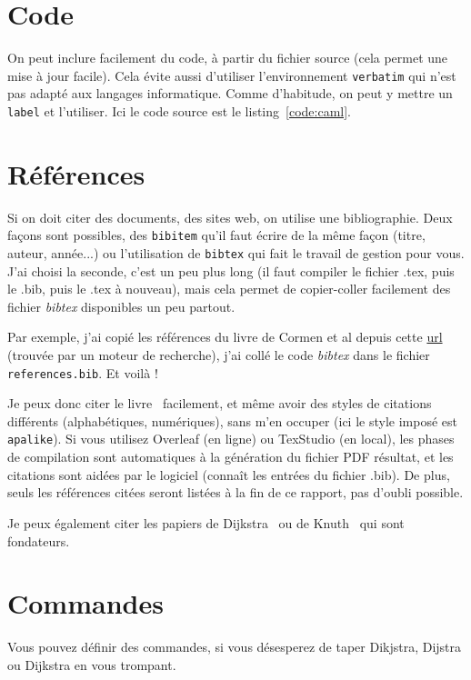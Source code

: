 \documentclass{rapportAlgoM1}
\begin{document}
\section{Code}
On peut inclure facilement du code, à partir du fichier source (cela permet une mise à jour facile). Cela évite aussi d'utiliser l'environnement \verb+verbatim+ qui n'est pas adapté aux langages informatique. Comme d'habitude, on peut y mettre un \verb+label+ et l'utiliser. Ici le code source est le listing~\ref{code:caml}.



\section{Références}
Si on doit citer des documents, des sites web, on utilise une bibliographie. Deux façons sont possibles, des \verb+bibitem+ qu'il faut écrire de la même façon (titre, auteur, année...) ou l'utilisation de \verb+bibtex+ qui fait le travail de gestion pour vous. J'ai choisi la seconde, c'est un peu plus long (il faut compiler le fichier .tex, puis le .bib, puis le .tex à nouveau), mais cela permet de copier-coller facilement des fichier \textit{bibtex} disponibles un peu partout.

Par exemple, j'ai copié les références du livre de Cormen et al depuis cette  \href{https://www.bibsonomy.org/bibtex/2225d42638921bee01b4ac8ff991b0a6a/rekstorm}{url} (trouvée par un moteur de recherche), j'ai collé le code\textit{ bibtex} dans le fichier \verb+references.bib+. Et voilà !

Je peux donc citer le livre~\cite{CormenIntroductionAlgo} facilement, et même avoir des styles de citations différents (alphabétiques, numériques), sans m'en occuper (ici le style imposé est \verb+apalike+). Si vous utilisez Overleaf (en ligne) ou TexStudio (en local), les phases de compilation sont automatiques à la génération du fichier PDF résultat, et les citations sont aidées par le logiciel (connaît les entrées du fichier .bib). De plus, seuls les références citées seront listées à la fin de ce rapport, pas d'oubli possible.

Je peux également citer les papiers de Dijkstra~\cite{Dijkstra1959} ou de Knuth~\cite{Knuth1997} qui sont fondateurs.

\section{Commandes}
Vous pouvez définir des commandes, si vous désesperez de taper Dikjstra, Dijstra ou Dijkstra en vous trompant.
\end{document}
